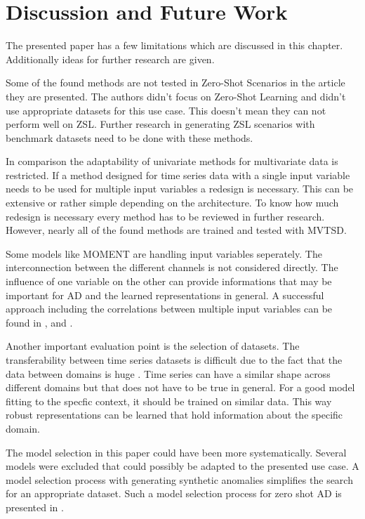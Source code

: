 \section{Discussion and Future Work}\label{discussion}
The presented paper has a few limitations which are discussed in this chapter. Additionally ideas for further research are given.

Some of the found methods are not tested in Zero-Shot Scenarios in the article they are presented. The authors didn't focus on Zero-Shot Learning and didn't use appropriate datasets for this use case.  This doesn't mean they can not perform well on ZSL. Further research in generating ZSL scenarios with benchmark datasets need to be done with these methods.

In comparison the adaptability of univariate methods for multivariate data is restricted. If a method designed for time series data with a single input variable needs to be used for multiple input variables a redesign is necessary. This can be extensive or rather simple depending on the architecture. To know how much redesign is necessary every method has to be reviewed in further research. However, nearly all of the found methods are trained and tested with MVTSD.

Some models like MOMENT are handling input variables seperately. The interconnection between the different channels is not considered directly. The influence of one variable on the other can provide informations that may be important for AD and the learned representations in general. A successful approach including the correlations between multiple input variables can be found in \cite{pranavan_contrastive_2022}, \cite{wang_multiscale_2023} and \cite{han_learning_2022}.

Another important evaluation point is the selection of datasets. The transferability between time series datasets is difficult due to the fact that the data between domains is huge \cite{ma_survey_2023}. Time series can have a similar shape across different domains but that does not have to be true in general. For a good model fitting to the specfic context, it should be trained on similar data. This way robust representations can be learned that hold information about the specific domain.


The model selection in this paper could have been more systematically. Several models were excluded that could possibly be adapted to the presented use case. A model selection process with generating synthetic anomalies simplifies the search for an appropriate dataset. Such a model selection process for zero shot AD is presented in \cite{fung_model_2024}.

